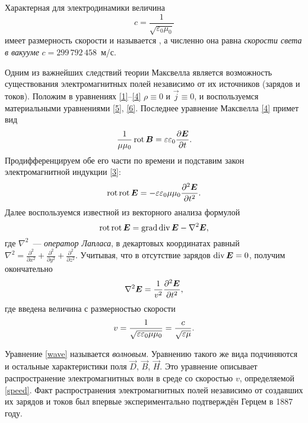 Характерная для электродинамики величина
\[
c=\frac{1}{\sqrt{\varepsilon_0\mu_0}}
\]
имеет размерность скорости и называется , 
а численно она равна \emph{скорости света в вакууме} $c=299\,792\,458$~м/с.

\label{sec:emwaves}

Одним из важнейших следствий теории Максвелла является возможность существования
электромагнитных полей независимо от их источников (зарядов и токов).
Положим в уравнениях \eqref{1}--\eqref{4} $\rho\equiv 0$ и $\vec{j}\equiv 0$,
и воспользуемся материальными уравнениями \eqref{5}, \eqref{6}.
Последнее уравнение Максвелла \eqref{4} примет вид
\[
\frac{1}{\mu \mu_0} \mathop{\mathrm{rot}} {\boldsymbol{B}} =  \varepsilon \varepsilon_0 \frac{\partial {\boldsymbol{E}}}{\partial t}.
\]
Продифференцируем обе его части по времени и подставим закон электромагнитной индукции \eqref{3}:
\[
\mathop{\mathrm{rot}}\mathop{\mathrm{rot}} {\boldsymbol{E}} = -\varepsilon\varepsilon_0 \mu\mu_0 \frac{\partial^2 {\boldsymbol{E}}}{\partial t^2}.
\]
Далее воспользуемся известной из векторного анализа формулой
\begin{equation} \eqmark{rotrot}
\Rot\Rot\vec{E}=\Grad\Div\vec{E}-\nabla^2\vec{E},
\end{equation}
где $\nabla^2$~--- \emph{оператор Лапласа}, в декартовых координатах равный
$\nabla^2 = \frac{\partial^2}{\partial x^2} + 
\frac{\partial^2}{\partial y^2}+
\frac{\partial^2}{\partial z^2}$.
Учитывая, что в отсутствие зарядов $\mathop{\mathrm{div}}{\boldsymbol{E}}=0$, получим окончательно
\begin{equation} \eqmark{wave}
\nabla^2\vec{E}=\frac{1}{v^2} \frac{\partial^2 \vec{E}}{\partial t^2},
\end{equation}
где введена величина с размерностью скорости
\begin{equation}\eqmark{speed}
v = \frac{1}{\sqrt{\varepsilon\varepsilon_0 \mu \mu_0}}= \frac{c}{\sqrt{\varepsilon\mu}}.
\end{equation}

Уравнение \eqref{wave} называется \emph{волновым}. Уравнению такого же вида 
подчиняются и остальные характеристики поля $\vec{D}$, $\vec{B}$, $\vec{H}$. 
Это уравнение описывает распространение электромагнитных волн в среде со скоростью $v$,
определяемой \eqref{speed}. Факт распространения электромагнитных полей независимо
от создавших их зарядов и токов был впервые экспериментально подтверждён
Герцем в 1887 году.


